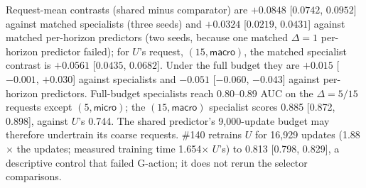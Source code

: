 \begin{revblock}
Request-mean contrasts (shared minus comparator) are $+0.0848$ [$0.0742$, $0.0952$] against matched specialists (three seeds) and $+0.0324$ [$0.0219$, $0.0431$] against matched per-horizon predictors (two seeds, because one matched $\Delta=1$ per-horizon predictor failed); for $U$'s request, $(15,\textsf{macro})$, the matched specialist contrast is $+0.0561$ [$0.0435$, $0.0682$]. Under the full budget they are $+0.015$ [$-0.001$, $+0.030$] against specialists and $-0.051$ [$-0.060$, $-0.043$] against per-horizon predictors. Full-budget specialists reach 0.80--0.89 AUC on the $\Delta=5/15$ requests except $(5,\textsf{micro})$; the $(15,\textsf{macro})$ specialist scores 0.885 [0.872, 0.898], against $U$'s 0.744. The shared predictor's 9,000-update budget may therefore undertrain its coarse requests. \#140 retrains $U$ for 16,929 updates (1.88$\times$ the updates; measured training time 1.654$\times$ $U$'s) to 0.813 [0.798, 0.829], a descriptive control that failed G-action; it does not rerun the selector comparisons.
\end{revblock}

\subsection{\texorpdfstring{}{Same-checkpoint controls, tied axes and the remaining-frames input}}
\label{sec:app:res:controls}

